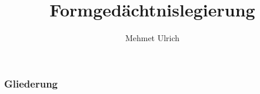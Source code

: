 \documentclass{beamer}
\title{Formgedächtnislegierung}
\author[Mehmet Ulrich]{Mehmet Ulrich}
\begin{document}
\frame{\titlepage}

\begin{frame}
\frametitle{Gliederung}
\tableofcontents[hideallsubsections]
\end{frame}



\end{document}
